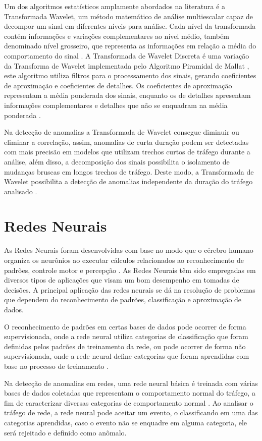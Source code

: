 \indent Um dos algoritmos estatísticos amplamente abordados na literatura é a Transformada Wavelet, um método matemático de análise multiescalar capaz de decompor um sinal em diferentes níveis para análise. Cada nível da transformada contém informações e variações complementares ao nível médio, também denominado nível grosseiro, que representa as informações em relação a média do comportamento do sinal \cite{perlin2011}. A Transformada de Wavelet Discreta é uma variação da Transforma de Wavelet implementada pelo Algoritmo Piramidal de Mallat \cite{mallat1998}, este algoritmo utiliza filtros para o processamento dos sinais, gerando coeficientes de aproximação e coeficientes de detalhes. Os coeficientes de aproximação representam a média ponderada dos sinais, enquanto os de detalhes apresentam informações complementares e detalhes que não se enquadram na média ponderada \cite{Righi2014}.

\indent Na detecção de anomalias a Transformada de Wavelet consegue diminuir ou eliminar a correlação, assim, anomalias de curta duração podem ser detectadas com mais precisão em modelos que utilizam trechos curtos de tráfego durante a análise, além disso, a decomposição dos sinais possibilita o isolamento de mudanças bruscas em longos trechos de tráfego. Deste modo, a Transformada de Wavelet possibilita a detecção de anomalias independente da duração do tráfego analisado \cite{Wang2009}.

  \section{Redes Neurais}
\indent As Redes Neurais foram desenvolvidas com base no modo que o cérebro humano organiza os neurônios ao executar cálculos relacionados ao reconhecimento de padrões, controle motor e percepção \cite{Bhuyan}. As Redes Neurais têm sido empregadas em diversos tipos de aplicações que visam um bom desempenho em tomadas de decisões. A principal aplicação das redes neurais se dá na resolução de problemas que dependem do reconhecimento de padrões, classificação e aproximação de dados.

\indent O reconhecimento de padrões em certas bases de dados pode ocorrer de forma supervisionada, onde a rede neural utiliza categorias de classificação que foram definidas pelos padrões de treinamento da rede, ou pode ocorrer de forma não supervisionada, onde a rede neural define categorias que foram aprendidas com base no processo de treinamento \cite{ripley1996}.

\indent Na detecção de anomalias em redes, uma rede neural básica é treinada com várias bases de dados coletadas que representam o comportamento normal do tráfego, a fim de caracterizar diversas categorias de comportamento normal \cite{chandola2009}. Ao analisar o tráfego de rede, a rede neural pode aceitar um evento, o classificando em uma das categorias aprendidas, caso o evento não se enquadre em alguma categoria, ele será rejeitado e definido como anômalo.

